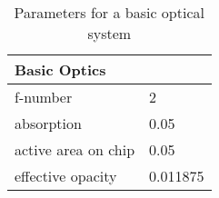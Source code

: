 \begin{table}[H]
\centering
\caption{Parameters for a basic optical system}
\label{tab:basic_optics}
\begin{tabular}{|l|l|}\hline
\textbf{Basic Optics}       & \\ \hline
f-number            & 2        \\
absorption          & 0.05     \\
active area on chip & 0.05     \\
effective opacity       & 0.011875 \\ \hline
\end{tabular}
\end{table}